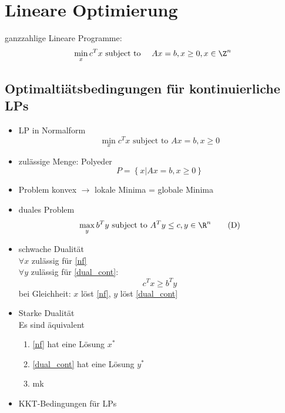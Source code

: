 \section{Lineare Optimierung}
ganzzahlige Lineare Programme:
\begin{equation*}
	\min_{x} c^Tx \text{ subject to } \quad Ax = b, x \geq 0, x \in \Z^n
\end{equation*} 
\subsection{Optimaltiätsbedingungen für kontinuierliche LPs}
\begin{itemize}
	\item LP in Normalform 
		\begin{equation*}\label{nf}
			\min_{x} c^Tx \text{ subject to } Ax = b, x\geq 0\tag{P}
		\end{equation*} 
	\item zulässige Menge: Polyeder
		\begin{equation*}
			P = \left\{ x | Ax = b ,x \geq 0 \right\}
		\end{equation*} 
	\item Problem konvex $\to$	lokale Minima = globale Minima	
	\item duales Problem
		\begin{equation*}\label{dual_cont}
			\max_{y}b^Ty \text{ subject to } A^Ty \leq c, y \in \R^n \tag{D}
		\end{equation*} 
	\item schwache Dualität\\
		$\forall x$ zulässig für \eqref{nf}\\%
		$\forall y$ zulässig für \eqref{dual_cont}:%
		\begin{equation*}
			c^Tx \geq b^Ty
		\end{equation*} 
		bei Gleichheit: $x$ löst \eqref{nf}, $y$ löst \eqref{dual_cont}
	\item Starke Dualität\\
		Es sind äquivalent 
		\begin{enumerate}
			\item \eqref{nf} hat eine Lösung $x^*$
			\item \eqref{dual_cont} hat eine Lösung $y^*$ 
			\item mk
		\end{enumerate} 
	\item KKT-Bedingungen für LPs
		\begin{itemize}

\end{itemize}
\end{itemize}
